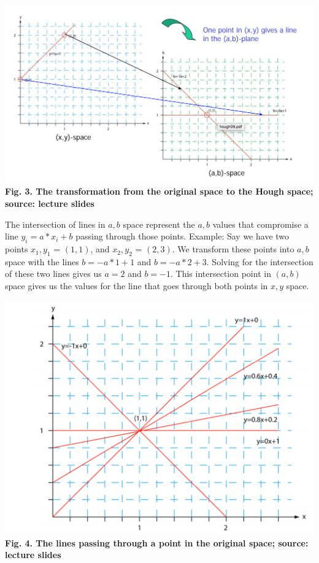 \documentclass{article}
\begin{document}
\includegraphics[width=\textwidth]{hough_transform.png}
\textbf{Fig. 3. The transformation from the original space to the Hough space; source: lecture slides}

The intersection of lines in $a,b$ space represent the $a,b$ values that compromise a line $y_i = a*x_i + b$ passing through those points. Example:
Say we have two points $x_1,y_1$ = $(1,1)$, and $x_2,y_2$ = $(2,3)$.
We transform these points into $a,b$ space with the lines $b = -a*1 + 1$ and $b = -a*2 + 3$.
Solving for the intersection of these two lines gives us $a=2$ and $b=-1$. This intersection point in $(a,b)$ space gives us the values for the line that goes through both points in $x,y$ space.

\includegraphics[width=\textwidth]{hough_transform2.png}
\textbf{Fig. 4. The lines passing through a point in the original space; source: lecture slides}
\end{document}
